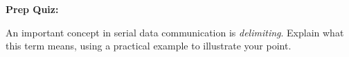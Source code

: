 \vfil \eject

\noindent
{\bf Prep Quiz:}

An important concept in serial data communication is {\it delimiting}.  Explain what this term means, using a practical example to illustrate your point.




